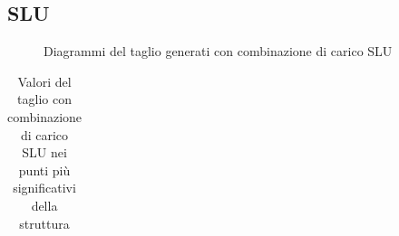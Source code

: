 \begin{landscape}
\subsection*{SLU}
\begin{figure}[H]
\centering
{} 
\caption{Diagrammi del taglio generati con combinazione di carico SLU}
\label{fig:Tagli_ULS}
\end{figure}
\begin{table}[H]
\centering
\caption{Valori del taglio con combinazione di carico SLU nei punti più significativi della struttura}
	\begin{tabular}{lS[table-format=3.2]S[table-format=3.2]S[table-format=3.2]S[table-format=3.2]S[table-format=3.2]S[table-format=3.2]S[table-format=3.2]S[table-format=3.2]S[table-format=3.2]S[table-format=3.2]S[table-format=3.2]S[table-format=3.2]S[table-format=3.2]}

\end{tabular}
\end{table}
\end{landscape}

